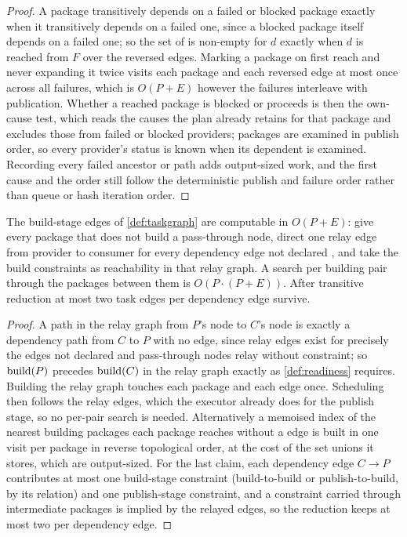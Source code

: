 \begin{proof}
A package transitively depends on a failed or blocked package exactly when it
transitively depends on a failed one, since a blocked package itself depends
on a failed one; so the set  of  is non-empty for $d$
exactly when $d$ is reached from $F$ over the reversed edges. Marking a
package on first reach and never expanding it twice visits each package and
each reversed edge at most once across all failures, which is $O(P + E)$
however the failures interleave with publication. Whether a reached package is
blocked or proceeds is then the own-cause test, which reads the causes the
plan already retains for that package and excludes those from failed or
blocked providers; packages are examined in publish order, so every
provider's status is known when its dependent is examined. Recording every
failed ancestor or path adds output-sized work, and the first cause and the
 order still follow the deterministic publish and failure order
rather than queue or hash iteration order.
\end{proof}

\begin{proposition}
\label{prop:readiness-cost}
The build-stage edges of \cref{def:taskgraph} are computable in $O(P + E)$:
give every package that does not build a pass-through node, direct one relay
edge from provider to consumer for every dependency edge not declared
, and take the build constraints as reachability in that relay
graph. A search per building pair through the packages between them is $O(P
\cdot (P + E))$. After transitive reduction at most two task edges per
dependency edge survive.
\end{proposition}

\begin{proof}
A path in the relay graph from $P$'s node to $C$'s node is exactly a
dependency path from $C$ to $P$ with no  edge, since relay edges
exist for precisely the edges not declared  and pass-through
nodes relay without constraint; so $\mathrm{build}(P)$ precedes $\mathrm{build}(C)$ in the
relay graph exactly as \cref{def:readiness} requires. Building the relay graph
touches each package and each edge once. Scheduling then follows the relay
edges, which the executor already does for the publish stage, so no
per-pair search is needed. Alternatively a memoised index of the nearest
building packages each package reaches without a  edge is built in
one visit per package in reverse topological order, at the cost of the set
unions it stores, which are output-sized. For the last claim, each dependency
edge $C \to P$ contributes at most one build-stage constraint (build-to-build
or publish-to-build, by its relation) and one publish-stage constraint, and a
constraint carried through intermediate packages is implied by the relayed
edges, so the reduction keeps at most two per dependency edge.
\end{proof}

